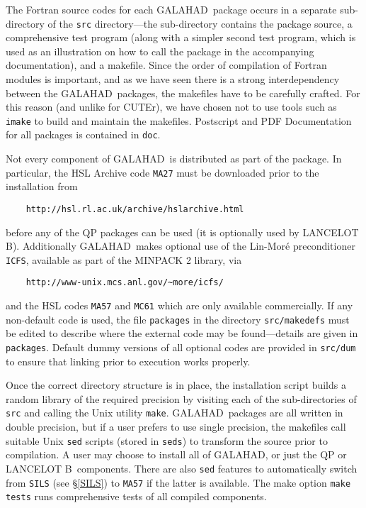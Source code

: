 \documentclass[twoside]{article}
\newcommand{\gal}{{\sf GALAHAD}}
\newcommand{\lanb}{{\sf LANCELOT B}}
\newcommand{\cuter}{{\sf CUTEr}}
\begin{document}
The Fortran source codes for each \gal\ package occurs
in a separate sub-directory of the {\tt src} directory---the sub-directory
contains the package source, a comprehensive test program (along with
a simpler second test program, which is used as an illustration on how
to call the package in the accompanying documentation), and a makefile.
Since the order of compilation of Fortran modules is important, and as
we have seen there is a strong interdependency between the \gal\ packages,
the makefiles have to be carefully crafted. For this reason (and unlike
for \cuter), we have chosen not to use tools such as {\tt imake} to build and
maintain the makefiles. Postscript and PDF Documentation for all packages
is contained in {\tt doc}.

Not every component of \gal\ is distributed as part of the package. In
particular, the HSL Archive code {\tt MA27} must be downloaded prior to
the installation from
\begin{verbatim}
    http://hsl.rl.ac.uk/archive/hslarchive.html
\end{verbatim}
before any of the QP packages can be used (it is optionally used by \lanb).
Additionally \gal\ makes optional use of the
Lin-Mor\'{e} preconditioner {\tt ICFS}, available as
part of the MINPACK 2 library, via
\begin{verbatim}
    http://www-unix.mcs.anl.gov/~more/icfs/
\end{verbatim}
and the HSL codes {\tt MA57} and {\tt MC61} which are only available
commercially. If any non-default code is used, the file {\tt packages}
in the directory {\tt src/makedefs} must be edited to describe where
the external code may be found---details are given in {\tt packages}.
Default dummy versions of all optional codes are provided in
{\tt src/dum} to ensure that linking prior to execution works properly.

Once the correct directory structure is in place, the installation script
builds a random library of the required precision by visiting each
of the sub-directories of {\tt src} and calling the Unix utility {\tt make}.
\gal\ packages are all written in double precision, but if a user prefers to
use single precision, the makefiles call suitable Unix {\tt sed}
scripts (stored in {\tt seds}) to transform the source prior to compilation.
A user may choose to install all of \gal, or just the QP or \lanb\ components.
There are also {\tt sed} features to automatically switch from {\tt SILS} (see
 \S\ref{SILS}) to {\tt MA57} if the latter is available.
The make option {\tt make tests} runs comprehensive tests of all
compiled components.
\end{document}
